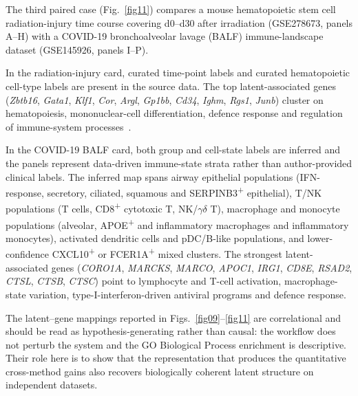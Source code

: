 \documentclass[referee, pdflatex, sn-vancouver-num]{sn-jnl}
\begin{document}
The third paired case (Fig.~\ref{fig11}) compares a mouse hematopoietic stem cell radiation-injury time course covering d0--d30 after irradiation (GSE278673, panels A--H) with a COVID-19 bronchoalveolar lavage (BALF) immune-landscape dataset (GSE145926, panels I--P).

In the radiation-injury card, curated time-point labels and curated hematopoietic cell-type labels are present in the source data. The top latent-associated genes (\textit{Zbtb16}, \textit{Gata1}, \textit{Klf1}, \textit{Cor}, \textit{Argl}, \textit{Gp1bb}, \textit{Cd34}, \textit{Ighm}, \textit{Rgs1}, \textit{Junb}) cluster on hematopoiesis, mononuclear-cell differentiation, defence response and regulation of immune-system processes~\cite{orkin2008hematopoiesis}.

In the COVID-19 BALF card, both group and cell-state labels are inferred and the panels represent data-driven immune-state strata rather than author-provided clinical labels. The inferred map spans airway epithelial populations (IFN-response, secretory, ciliated, squamous and SERPINB3\textsuperscript{+} epithelial), T/NK populations (T cells, CD8\textsuperscript{+} cytotoxic T, NK/$\gamma\delta$ T), macrophage and monocyte populations (alveolar, APOE\textsuperscript{+} and inflammatory macrophages and inflammatory monocytes), activated dendritic cells and pDC/B-like populations, and lower-confidence CXCL10\textsuperscript{+} or FCER1A\textsuperscript{+} mixed clusters. The strongest latent-associated genes (\textit{CORO1A}, \textit{MARCKS}, \textit{MARCO}, \textit{APOC1}, \textit{IRG1}, \textit{CD8E}, \textit{RSAD2}, \textit{CTSL}, \textit{CTSB}, \textit{CTSC}) point to lymphocyte and T-cell activation, macrophage-state variation, type-I-interferon-driven antiviral programs and defence response.

The latent--gene mappings reported in Figs.~\ref{fig09}--\ref{fig11} are correlational and should be read as hypothesis-generating rather than causal: the workflow does not perturb the system and the GO Biological Process enrichment is descriptive. Their role here is to show that the representation that produces the quantitative cross-method gains also recovers biologically coherent latent structure on independent datasets.
\end{document}
